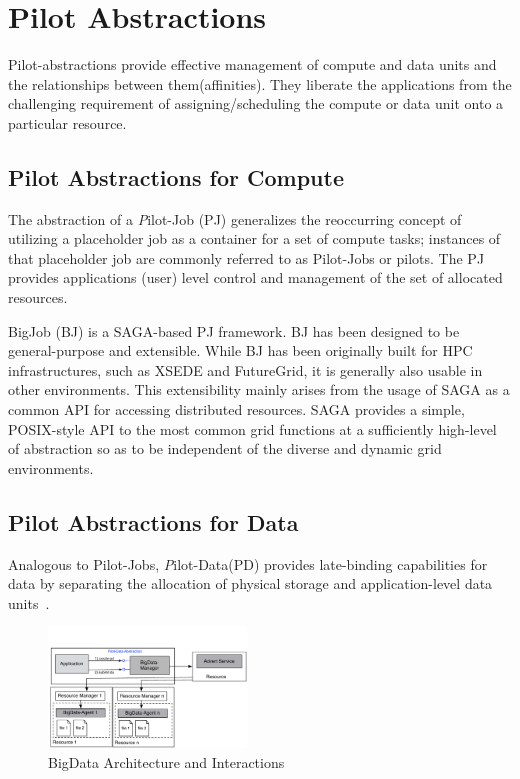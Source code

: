 \documentclass{acm_proc_article-sp}
\newcommand{\pnote}[1]{ {\textcolor{magenta} { ***pradeep: #1 }}}
\newcommand{\pnote}[1]{}
\newcommand{\pilotjob}{Pilot-Job\xspace}
\newcommand{\pilotjobs}{Pilot-Jobs\xspace}
\begin{document}


\section{Pilot Abstractions}
\label{sec-pilot-impl}

Pilot-abstractions provide effective management of compute and data units and the relationships between them(affinities).  They liberate 
the applications from the challenging  requirement of assigning/scheduling the compute or data unit onto a particular resource.

\subsection{Pilot Abstractions for Compute}
The abstraction of a {\emph \pilotjob} (PJ) generalizes the reoccurring concept of
utilizing a placeholder job as a container for a set of compute tasks;
instances of that placeholder job are commonly referred to as Pilot-Jobs or
pilots. The PJ provides applications (user) level control and management of
the set of allocated resources. 

BigJob (BJ) is a SAGA-based PJ framework. BJ has been designed to be general-purpose and extensible. 
While BJ has been originally built for HPC infrastructures, such as XSEDE and FutureGrid, it is generally also usable in other environments. 
This extensibility mainly arises from the usage of SAGA as a common API for accessing distributed resources. 
SAGA provides a simple, POSIX-style API to the most common grid functions at a sufficiently high-level of abstraction 
so as to be independent of the diverse and dynamic grid environments.~\cite{pstar-2012}

\subsection{Pilot Abstractions for Data}
Analogous to \pilotjobs, {\emph Pilot-Data}(PD)
provides late-binding capabilities for data by separating the allocation of
physical storage and application-level data units~\cite{pstar-2012}.

\begin{figure}[htbp]
	\centering
		\includegraphics[width=0.47\textwidth]{figures/bigdata.pdf}
	\caption{BigData Architecture and Interactions}
	\label{fig:figures_bigdata}
\end{figure}
\end{document}
